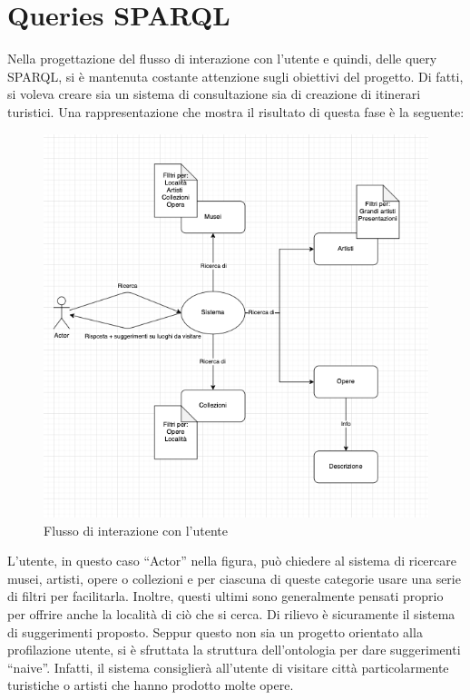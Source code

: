 \documentclass[12pt]{article}
\begin{document}
\section{Queries SPARQL }
Nella progettazione del flusso di interazione con l’utente e quindi, delle query SPARQL, si è mantenuta costante attenzione sugli obiettivi del progetto. Di fatti, si voleva creare sia un sistema di consultazione sia di creazione di itinerari turistici. 
Una rappresentazione che mostra il risultato di questa fase è la seguente:
\begin{figure}[!h]
   \centering
   \includegraphics[scale=0.6]{fig/flowchart interazione.png}
   \caption{Flusso di interazione con l'utente}\label{fig:picture}
\end{figure}

L’utente, in questo caso “Actor” nella figura, può chiedere al sistema di ricercare musei, artisti, opere o collezioni e per ciascuna di queste categorie usare una serie di filtri per facilitarla. Inoltre, questi ultimi sono generalmente pensati proprio per offrire anche la località di ciò che si cerca. Di rilievo è sicuramente il sistema di suggerimenti proposto. Seppur questo non sia un progetto orientato alla profilazione utente, si è sfruttata la struttura dell’ontologia per dare suggerimenti “naive”. Infatti, il sistema consiglierà all’utente di visitare città particolarmente turistiche o artisti che hanno prodotto molte opere.
\end{document}
